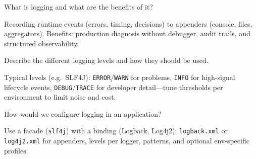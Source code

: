 \newpage


\question[4]
What is logging and what are the benefits of it?
\makeemptybox{1.25in}
\begin{solution}
  Recording runtime events (errors, timing, decisions) to appenders (console, files, aggregators). Benefits: production diagnosis without debugger, audit trails, and structured observability.
\end{solution}

\question[4]
Describe the different logging levels and how they should be used.
\makeemptybox{1.45in}
\begin{solution}
  Typical levels (e.g.\ SLF4J): \texttt{ERROR}/\texttt{WARN} for problems, \texttt{INFO} for high-signal lifecycle events, \texttt{DEBUG}/\texttt{TRACE} for developer detail---tune thresholds per environment to limit noise and cost.
\end{solution}

\question[4]
How would we configure logging in an application?
\makeemptybox{1.35in}
\begin{solution}
  Use a facade (\texttt{slf4j}) with a binding (Logback, Log4j2): \texttt{logback.xml} or \texttt{log4j2.xml} for appenders, levels per logger, patterns, and optional env-specific profiles.
\end{solution}

